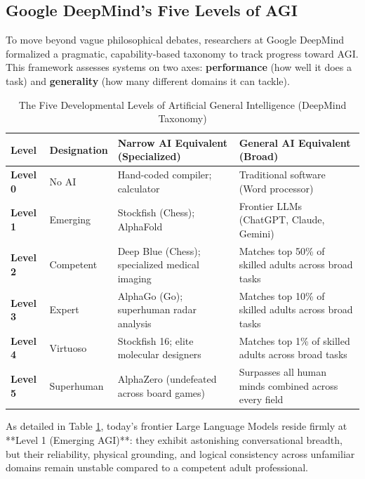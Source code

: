 \documentclass[11pt,journal,onecolumn]{IEEEtran}
\begin{document}
\subsection{Google DeepMind's Five Levels of AGI}
To move beyond vague philosophical debates, researchers at Google DeepMind formalized a pragmatic, capability-based taxonomy to track progress toward AGI. This framework assesses systems on two axes: \textbf{performance} (how well it does a task) and \textbf{generality} (how many different domains it can tackle).

\begin{table}[htbp]
\centering
\caption{The Five Developmental Levels of Artificial General Intelligence (DeepMind Taxonomy)}
\label{tab:deepmind_levels}
\begin{tabular}{@{}llll@{}}
\toprule
\textbf{Level} & \textbf{Designation} & \textbf{Narrow AI Equivalent (Specialized)} & \textbf{General AI Equivalent (Broad)} \\
\midrule
\textbf{Level 0} & No AI & Hand-coded compiler; calculator & Traditional software (Word processor) \\
\textbf{Level 1} & Emerging & Stockfish (Chess); AlphaFold & Frontier LLMs (ChatGPT, Claude, Gemini) \\
\textbf{Level 2} & Competent & Deep Blue (Chess); specialized medical imaging & Matches top 50\% of skilled adults across broad tasks \\
\textbf{Level 3} & Expert & AlphaGo (Go); superhuman radar analysis & Matches top 10\% of skilled adults across broad tasks \\
\textbf{Level 4} & Virtuoso & Stockfish 16; elite molecular designers & Matches top 1\% of skilled adults across broad tasks \\
\textbf{Level 5} & Superhuman & AlphaZero (undefeated across board games) & Surpasses all human minds combined across every field \\
\bottomrule
\end{tabular}
\end{table}

As detailed in Table \ref{tab:deepmind_levels}, today's frontier Large Language Models reside firmly at **Level 1 (Emerging AGI)**: they exhibit astonishing conversational breadth, but their reliability, physical grounding, and logical consistency across unfamiliar domains remain unstable compared to a competent adult professional.
\end{document}
